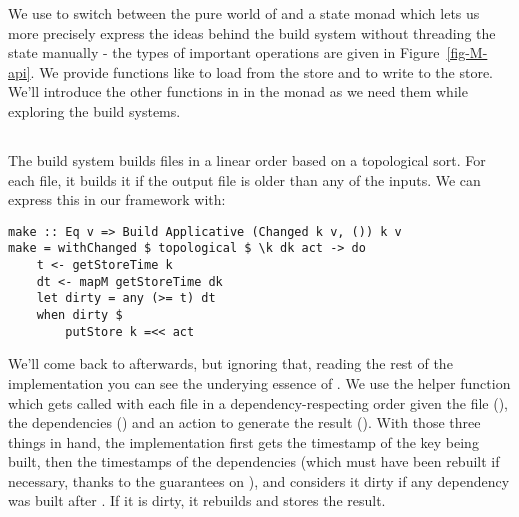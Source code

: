 We use  to switch between the pure world of  and a state monad  which lets us more precisely express the ideas behind the build system without threading the state manually - the types of important operations are given in Figure~\ref{fig-M-api}. We provide functions like  to load from the store and  to write to the store. We'll introduce the other functions in in the monad  as we need them while exploring the build systems.


\subsection{\Make}\label{sec-implementation-make}

The \Make build system builds files in a linear order based on a topological sort. For each file, it builds it if the output file is older than any of the inputs. We can express this in our framework with:

\begin{verbatim}
make :: Eq v => Build Applicative (Changed k v, ()) k v
make = withChanged $ topological $ \k dk act -> do
    t <- getStoreTime k
    dt <- mapM getStoreTime dk
    let dirty = any (>= t) dt
    when dirty $
        putStore k =<< act
\end{verbatim}

We'll come back to  afterwards, but ignoring that, reading the rest of the implementation you can see the underying essence of \Make. We use the helper function  which gets called with each file in a dependency-respecting order given the file (), the dependencies () and an action to generate the result (). With those three things in hand, the implementation first gets the timestamp of the key being built, then the timestamps of the dependencies (which must have been rebuilt if necessary, thanks to the guarantees on ), and considers it dirty if any dependency was built after . If it is dirty, it rebuilds and stores the result.

